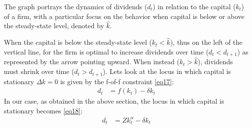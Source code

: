 \documentclass[12pt]{report}
\begin{document}
The graph portrays the dynamics of dividends (\(d_t\)) in relation to the capital (\(k_t\)) of a firm, with a
particular focus on the behavior when capital is below or above the steady-state level,  denoted by \(\hat{k}\).

When the capital is below the steady-state level (\(k_t < \hat{k}\)), thus on the left of the vertical line, for the
firm is optimal to increase dividends over time (\(d_t<d_{t+1}\)) as represented by the arrow pointing upward. When instead
(\(k_t > \hat{k}\)), dividends must shrink over time (\(d_t>d_{t+1}\)).
Lets look at the locus in which capital is stationary \(\Delta k = 0 \) is given by the f-of-f constraint \ref{eq17}:
\begin{align}
    d_t & = f(k_t) - \delta k_t
\end{align}
In our case, as obtained in the above section, the locus in which capital is stationary becomes \ref{eq18}:
\begin{align}
    d_t &=Z k^{\alpha}_t-\delta k_t
\end{align}
\end{document}
